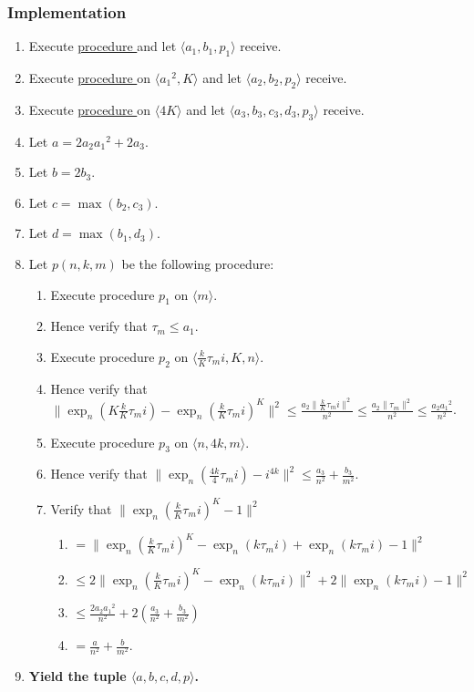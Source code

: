 \documentclass{article}
\newcounter{procedure}[part]
\newcommand{\implementation}{\subsubsection*{Implementation}}
\newcommand{\procedurehr}[1]{\hyperref[sec:procedure #1]{procedure \expandafter\csname procedure#1\endcsname}}
\begin{document}
\begin{multicols}{2}
			\implementation
				\begin{enumerate}
					\item Execute \procedurehr{3.50} and let $\langle a_1,b_1,p_1\rangle$ receive.
					\item Execute \procedurehr{3.16} on $\langle {a_1}^2,K\rangle$ and let $\langle a_2,b_2,p_2\rangle$ receive.
					\item Execute \procedurehr{3.56} on $\langle 4K\rangle$ and let $\langle a_3,b_3,c_3,d_3,p_3\rangle$ receive.
					\item Let $a=2a_2{a_1}^2+2a_3$.
					\item Let $b=2b_3$.
					\item Let $c=\max(b_2,c_3)$.
					\item Let $d=\max(b_1,d_3)$.
					\item Let $p(n,k,m)$ be the following procedure:
					\begin{enumerate}
						\item Execute procedure $p_1$ on $\langle m\rangle$.
						\item Hence verify that $\tau_m\le a_1$.
						\item Execute procedure $p_2$ on $\langle\frac{k}{K}\tau_mi,K,n\rangle$.
						\item Hence verify that $\lVert\exp_n(K\frac{k}{K}\tau_mi)-\exp_n(\frac{k}{K}\tau_mi)^K\rVert^2\le\frac{a_2\lVert\frac{k}{K}\tau_mi\rVert^2}{n^2}\le\frac{a_2\lVert\tau_m\rVert^2}{n^2}\le\frac{a_2{a_1}^2}{n^2}$.
						\item Execute procedure $p_3$ on $\langle n,4k,m\rangle$.
						\item Hence verify that $\lVert\exp_n(\frac{4k}{4}\tau_mi)-i^{4k}\rVert^2\le\frac{a_3}{n^2}+\frac{b_3}{m^2}$.
						\item Verify that $\lVert\exp_n(\frac{k}{K}\tau_mi)^K-1\rVert^2$
						\begin{enumerate}
							\item $=\lVert\exp_n(\frac{k}{K}\tau_mi)^K-\exp_n(k\tau_mi)+\exp_n(k\tau_mi)-1\rVert^2$
							\item $\le 2\lVert\exp_n(\frac{k}{K}\tau_mi)^K-\exp_n(k\tau_mi)\rVert^2+2\lVert\exp_n(k\tau_mi)-1\rVert^2$
							\item $\le\frac{2a_2{a_1}^2}{n^2}+2(\frac{a_3}{n^2}+\frac{b_3}{m^2})$
							\item $=\frac{a}{n^2}+\frac{b}{m^2}$.
						\end{enumerate}
					\end{enumerate}
					\item \textbf{Yield the tuple $\langle a,b,c,d,p\rangle$.}
				\end{enumerate}
	\end{multicols}
\end{document}
